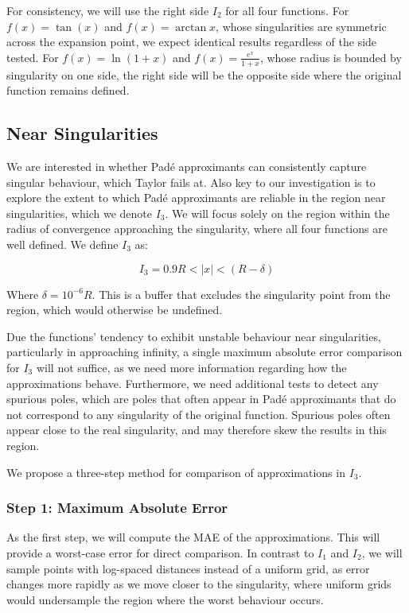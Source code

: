 \documentclass[a4paper, 12pt]{article}
\begin{document}
For consistency, we will use the right side $I_2$ for all four functions. For $f(x)=\tan (x)$ and $f(x)=\arctan x$, whose singularities are symmetric across the expansion point, we expect identical results regardless of the side tested. For $f(x)=\ln(1+x)$ and $f(x)=\frac{e^x}{1+x}$, whose radius is bounded by singularity on one side, the right side will be the opposite side where the original function remains defined.

\subsection{Near Singularities}
We are interested in whether Padé approximants can consistently capture singular behaviour, which Taylor fails at. Also key to our investigation is to explore the extent to which Padé approximants are reliable in the region near singularities, which we denote $I_3$. We will focus solely on the region within the radius of convergence approaching the singularity, where all four functions are well defined. We define $I_3$ as:

\begin{equation*}
    I_3= 0.9R < |x| < (R-\delta)
\end{equation*}

Where $\delta = 10^{-6}R$. This is a buffer that excludes the singularity point from the region, which would otherwise be undefined.

Due the functions' tendency to exhibit unstable behaviour near singularities, particularly in approaching infinity, a single maximum absolute error comparison for $I_3$ will not suffice, as we need more information regarding how the approximations behave. Furthermore, we need additional tests to detect any spurious poles, which are poles that often appear in Padé approximants that do not correspond to any singularity of the original function. Spurious poles often appear close to the real singularity, and may therefore skew the results in this region. 

We propose a three-step method for comparison of approximations in $I_3$.

\subsubsection{Step 1: Maximum Absolute Error}

As the first step, we will compute the MAE of the approximations. This will provide a worst-case error for direct comparison. In contrast to $I_1$ and $I_2$, we will sample points with log-spaced distances instead of a uniform grid, as error changes more rapidly as we move closer to the singularity, where uniform grids would undersample the region where the worst behaviour occurs.
\end{document}
